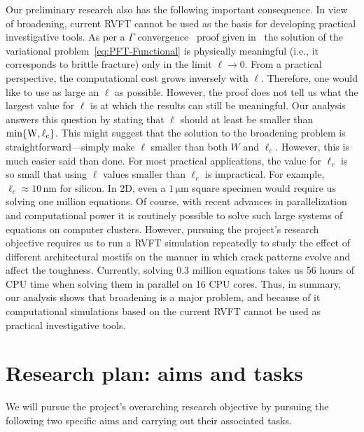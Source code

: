 \documentclass[10pt,letterpaper]{article}
\newcommand{\unit}[1]{\ensuremath{\, \mathrm{#1}}}
\begin{document}
    Our preliminary research also has the following important consequence. In view of broadening, current RVFT cannot be used as the basis for developing practical investigative tools. As per a $\mathit{\Gamma}$ convergence~\cite{braides2002gamma} proof given in~\cite{chambolle_2005, ambrosio_1990b} the solution of the variational problem~\eqref{eq:PFT-Functional} is physically meaningful (i.e., it corresponds to brittle fracture) only in the limit $\ell\to 0$.  From a practical perspective, the computational cost grows inversely with $\ell$.  Therefore, one would like to use as large an $\ell$ as possible.  However, the proof does not tell us what the largest value for $\ell$ is at which the results can still be meaningful. Our analysis answers this question by stating that $\ell$ should at least be smaller than $\rm{min}\{W, \ell_c\}$. This might suggest that the solution to the broadening problem is straightforward---simply make $\ell$ smaller than both $W$ and $\ell_c$.   However, this is much easier said than done.   For most practical applications, the value for $\ell_c$ is so small that using $\ell$ values smaller than $\ell_c$ is impractical.   For example, $\ell_c\approx 10\unit{nm}$ for silicon. In 2D, even a $1\unit{\mu m}$ square specimen would require us solving one million equations.  Of course, with recent advances in parallelization and computational power it is routinely possible to solve such large systems of equations on computer clusters.  However, pursuing the project's research objective  requires us to run a RVFT simulation repeatedly to study the effect of different architectural mostifs on the manner in which crack patterns evolve and affect the toughness. Currently, solving 0.3 million equations takes us 56 hours of CPU time when solving them in parallel on 16 CPU cores. Thus, in summary, our analysis shows that broadening is a major problem, and because of it computational simulations based on the current RVFT cannot be used as practical investigative tools.%


\label{sec:StartegyForResolutionofBroadening}

  \section{Research plan: aims and tasks}
    \label{s:aims}

    We will pursue the project's overarching  research objective by pursuing the following two specific aims and carrying out their associated tasks.%
\end{document}
